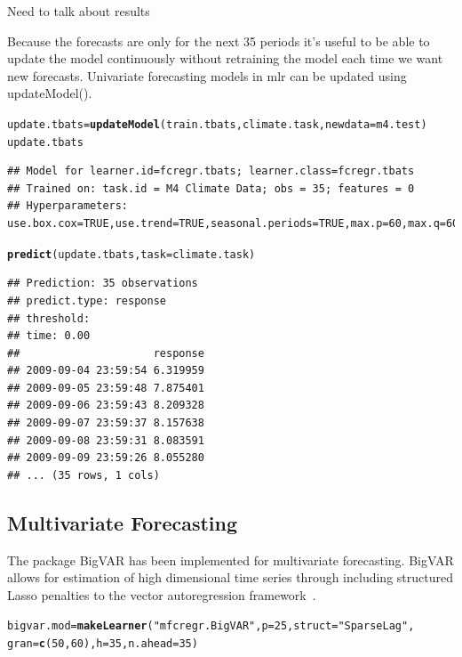 \documentclass{article}\usepackage[]{graphicx}\usepackage[]{color}
\makeatletter
\newcommand{\hlnum}[1]{\textcolor[rgb]{0.686,0.059,0.569}{#1}}%
\newcommand{\hlstr}[1]{\textcolor[rgb]{0.192,0.494,0.8}{#1}}%
\newcommand{\hlstd}[1]{\textcolor[rgb]{0.345,0.345,0.345}{#1}}%
\newcommand{\hlkwb}[1]{\textcolor[rgb]{0.69,0.353,0.396}{#1}}%
\newcommand{\hlkwc}[1]{\textcolor[rgb]{0.333,0.667,0.333}{#1}}%
\newcommand{\hlkwd}[1]{\textcolor[rgb]{0.737,0.353,0.396}{\textbf{#1}}}%
\newenvironment{kframe}{%
 \def\at@end@of@kframe{}%
 \ifinner\ifhmode%
  \def\at@end@of@kframe{\end{minipage}}%
  \begin{minipage}{\columnwidth}%
 \fi\fi%
 \def\FrameCommand##1{\hskip\@totalleftmargin \hskip-\fboxsep
 \colorbox{shadecolor}{##1}\hskip-\fboxsep
     \hskip-\linewidth \hskip-\@totalleftmargin \hskip\columnwidth}%
 \MakeFramed {\advance\hsize-\width
   \@totalleftmargin\z@ \linewidth\hsize
   \@setminipage}}%
 {\par\unskip\endMakeFramed%
 \at@end@of@kframe}
\newenvironment{knitrout}{}{} %
\theoremstyle{definition}
\newcommand\code{\@codex}
\def\@codex#1{{\normalfont\ttfamily\hyphenchar\font=-1 #1}}
\newcommand{\pkg}[1]{{\fontseries{b}\selectfont #1}}
\makeatother
\begin{document}
Need to talk about results

Because the forecasts are only for the next 35 periods it's useful to be able to update the model continuously without retraining the model each time we want new forecasts. Univariate forecasting models in \pkg{mlr} can be updated using \code{updateModel()}. 

\begin{knitrout}
\color{fgcolor}\begin{kframe}
\begin{alltt}
\hlstd{update.tbats} \hlkwb{=} \hlkwd{updateModel}\hlstd{(train.tbats, climate.task,} \hlkwc{newdata} \hlstd{= m4.test)}
\hlstd{update.tbats}
\end{alltt}
\begin{verbatim}
## Model for learner.id=fcregr.tbats; learner.class=fcregr.tbats
## Trained on: task.id = M4 Climate Data; obs = 35; features = 0
## Hyperparameters: use.box.cox=TRUE,use.trend=TRUE,seasonal.periods=TRUE,max.p=60,max.q=60,stationary=FALSE,use.arma.errors=TRUE,h=35
\end{verbatim}
\begin{alltt}
\hlkwd{predict}\hlstd{(update.tbats,} \hlkwc{task} \hlstd{= climate.task)}
\end{alltt}
\begin{verbatim}
## Prediction: 35 observations
## predict.type: response
## threshold: 
## time: 0.00
##                     response
## 2009-09-04 23:59:54 6.319959
## 2009-09-05 23:59:48 7.875401
## 2009-09-06 23:59:43 8.209328
## 2009-09-07 23:59:37 8.157638
## 2009-09-08 23:59:31 8.083591
## 2009-09-09 23:59:26 8.055280
## ... (35 rows, 1 cols)
\end{verbatim}
\end{kframe}
\end{knitrout}

\subsection{Multivariate Forecasting}

The package \pkg{BigVAR} has been implemented for multivariate forecasting. \pkg{BigVAR} allows for estimation of high dimensional time series through including structured Lasso penalties to the vector autoregression framework~\cite{bigvarpaper}. 

\begin{knitrout}
\color{fgcolor}\begin{kframe}
\begin{alltt}
\hlstd{bigvar.mod} \hlkwb{=} \hlkwd{makeLearner}\hlstd{(}\hlstr{"mfcregr.BigVAR"}\hlstd{,}\hlkwc{p} \hlstd{=} \hlnum{25}\hlstd{,} \hlkwc{struct} \hlstd{=} \hlstr{"SparseLag"}\hlstd{,}
                         \hlkwc{gran} \hlstd{=} \hlkwd{c}\hlstd{(}\hlnum{50}\hlstd{,} \hlnum{60}\hlstd{),}\hlkwc{h} \hlstd{=} \hlnum{35}\hlstd{,} \hlkwc{n.ahead} \hlstd{=} \hlnum{35}\hlstd{)}
\end{alltt}
\end{kframe}
\end{knitrout}
\end{document}
